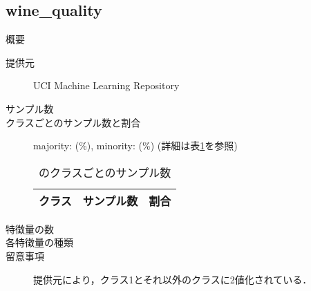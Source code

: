 \subsection{wine\_quality}
\begin{description}
    \item[概要] \cite{}
    \item[提供元] UCI Machine Learning Repository
    \item[サンプル数] 
    \item[クラスごとのサンプル数と割合] majority:  (\%), minority:  (\%) (詳細は表\ref{tab:}を参照)

        \begin{table}[htbp]
            \centering
            \caption{のクラスごとのサンプル数}
            \label{tab:}
            \begin{tabular}{lrc} \hline
                \multicolumn{1}{c}{クラス}&
                \multicolumn{1}{c}{サンプル数}&
                \multicolumn{1}{c}{割合}\\
                \hline
                \hline

                \hline
            \end{tabular}
        \end{table}

    \item[特徴量の数] 
    \item[各特徴量の種類] \mbox{}
        
    \item[留意事項] 提供元により，クラス1とそれ以外のクラスに2値化されている．
\end{description}


